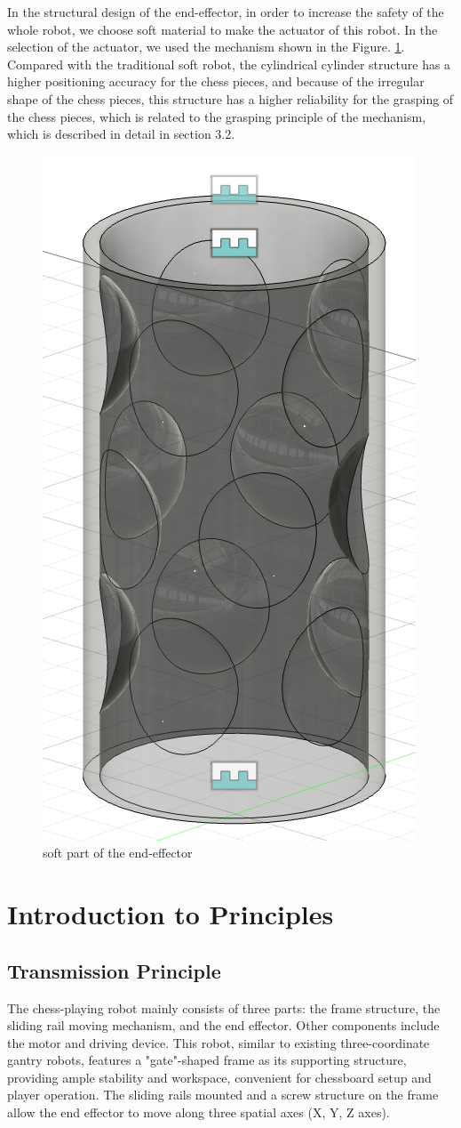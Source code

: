 \documentclass[10pt, a4paper, twocolumn]{article}
\begin{document}
In the structural design of the end-effector, in order to increase the safety of the whole robot, we choose soft material to make the actuator of this robot. In the selection of the actuator, we used the mechanism shown in the Figure. \ref{fig:soft shell}. Compared with the traditional soft robot, the cylindrical cylinder structure has a higher positioning accuracy for the chess pieces, and because of the irregular shape of the chess pieces, this structure has a higher reliability for the grasping of the chess pieces, which is related to the grasping principle of the mechanism, which is described in detail in section 3.2.

\begin{figure}
    \centering
    \includegraphics[width=0.2\linewidth]{soft shell.png}
    \caption{soft part of the end-effector}
    \label{fig:soft shell}
\end{figure}

\section{Introduction to Principles}
\subsection{Transmission Principle}
The chess-playing robot mainly consists of three parts: the frame structure, the sliding rail moving mechanism, and the end effector. Other components include the motor and driving device. This robot, similar to existing three-coordinate gantry robots, features a "gate"-shaped frame as its supporting structure, providing ample stability and workspace, convenient for chessboard setup and player operation. The sliding rails mounted and a screw structure on the frame allow the end effector to move along three spatial axes (X, Y, Z axes).
\end{document}
